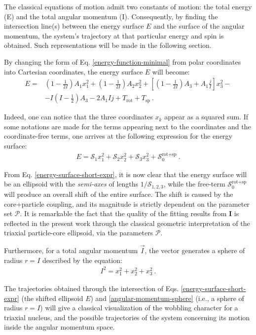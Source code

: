 \documentclass[myclassdoc,debug]{rjparticle}
\begin{document}
The classical equations of motion admit two constants of motion: the total energy (E) and the total angular momentum (I).  Consequently, by finding the intersection line(s) between the energy surface $E$ and the surface of the angular momentum, the system's trajectory at that particular energy and spin is obtained. Such representations will be made in the following section.

By changing the form of Eq. \ref{energy-function-minimal} from polar coordinates into Cartesian coordinates, the energy surface $E$ will become:
\begin{align}
    E=&\left(1-\frac{1}{2I}\right)A_1x_1^2+\left(1-\frac{1}{2I}\right)A_2x_2^2+\left[\left(1-\frac{1}{2I}\right)A_3+A_1\frac{j}{I}\right]x_3^2-\nonumber\\
    &-I\left(I-\frac{1}{2}\right)A_3-2A_1Ij+T_\text{rot}+T_\text{sp}\ .
    \label{energy-ellipsoid-cartesian}
\end{align}

Indeed, one can notice that the three coordinates $x_k$ appear as a squared sum. If some notations are made for the terms appearing next to the coordinates and the coordinate-free terms, one arrives at the following expression for the energy surface:
\begin{align}
    E=\mathcal{S}_1x_1^2+\mathcal{S}_2x_2^2+\mathcal{S}_3x_3^2+\mathcal{S}_0^\text{rot+sp}\ .
    \label{energy-surface-short-expr}
\end{align}

From Eq. \ref{energy-surface-short-expr}, it is now clear that the energy surface will be an ellipsoid with the \emph{semi-axes} of lengths $1/\mathcal{S}_{1,2,3}$, while the free-term $\mathcal{S}_0^\text{rot+sp}$ will produce an overall shift of the entire surface. The shift is caused by the core+particle coupling, and its magnitude is strictly dependent on the parameter set $\mathcal{P}$. It is remarkable the fact that the quality of the fitting results from \textbf{I} is reflected in the present work through the classical geometric interpretation of the triaxial particle-core ellipsoid, via the parameters $\mathcal{P}$.

Furthermore, for a total angular momentum $\vec{I}$, the vector generates a sphere of radius $r=I$ described by the equation:
\begin{align}
    I^2=x_1^2+x_2^2+x_3^2\ .
    \label{angular-momentum-sphere}
\end{align}

The trajectories obtained through the intersection of Eqs. \ref{energy-surface-short-expr} (the shifted ellipsoid $E$) and \ref{angular-momentum-sphere} (i.e., a sphere of radius $r=I$) will give a classical visualization of the wobbling character for a triaxial nucleus, and the possible trajectories of the system concerning its motion inside the angular momentum space.
\end{document}
